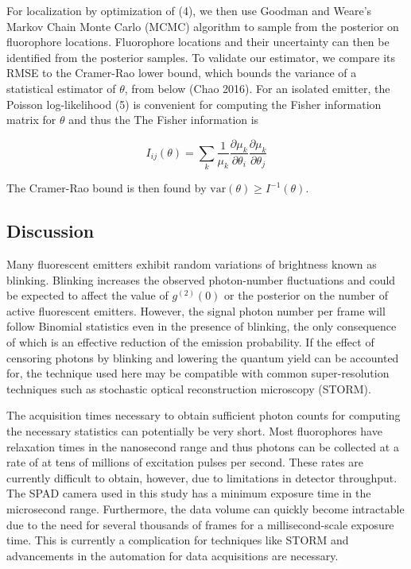 \documentclass[a4paper, twocolumn, superscriptaddress,prl]{revtex4}  %
\begin{document}
For localization by optimization of (4), we then use Goodman and Weare's Markov Chain Monte Carlo (MCMC) algorithm to sample from the posterior on fluorophore locations. Fluorophore locations and their uncertainty can then be identified from the posterior samples. To validate our estimator, we compare its RMSE to the Cramer-Rao lower bound, which bounds the variance of a statistical estimator of $\theta$, from below (Chao 2016). For an isolated emitter, the Poisson log-likelihood (5) is convenient for computing the Fisher information matrix for $\theta$ and thus the The Fisher information is \citep{Smith2010}

\begin{equation}
I_{ij}(\theta) = \sum_{k}\frac{1}{\mu_{k}}\frac{\partial \mu_{k}}{\partial\theta_{i}}\frac{\partial \mu_{k}}{\partial\theta_{j}}
\end{equation}

The Cramer-Rao bound is then found by $\mathrm{var}(\theta) \geq I^{-1}(\theta)$. 



\subsection{Discussion}

Many fluorescent emitters exhibit random variations of brightness known as blinking. Blinking increases the observed photon-number fluctuations and could be expected to affect the value of $g^{(2)}(0)$ or the posterior on the number of active fluorescent emitters. However, the signal photon number per frame will follow Binomial statistics even in the presence of blinking, the only consequence of which is an effective reduction of the emission probability. If the effect of censoring photons by blinking and lowering the quantum yield can be accounted for, the technique used here may be compatible with common super-resolution techniques such as stochastic optical reconstruction microscopy (STORM). 

The acquisition times necessary to obtain sufficient photon counts for computing the necessary statistics can potentially be very short. Most fluorophores have relaxation times in the nanosecond range and thus photons can be collected at a rate of at tens of millions of excitation pulses per second. These rates are currently difficult to obtain, however, due to limitations in detector throughput. The SPAD camera used in this study has a minimum exposure time in the microsecond range. Furthermore, the data volume can quickly become intractable due to the need for several thousands of frames for a millisecond-scale exposure time. This is currently a complication for techniques like STORM and advancements in the automation for data acquisitions are necessary. 
\end{document}
